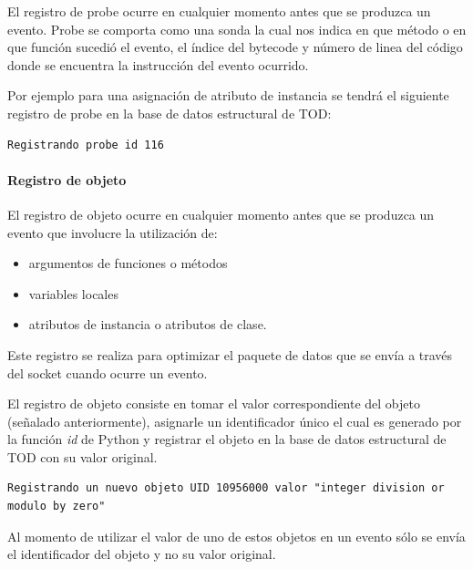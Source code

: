\documentclass[12pt,legalpaper]{report}
\begin{document}
El registro de probe ocurre en cualquier momento antes que se produzca un evento.  Probe se comporta como una sonda la cual nos indica en que método o en que función sucedió el evento, el índice del bytecode y número de linea del código donde se encuentra la instrucción del evento ocurrido.

Por ejemplo para una asignación de atributo de instancia se tendrá el siguiente registro de probe en la base de datos estructural de TOD:

\begin{singlespace}
\begin{lstlisting}[style=consola,numbers=none]
Registrando probe id 116
\end{lstlisting}
\end{singlespace}

				\paragraph{Registro de objeto}
				
El registro de objeto ocurre en cualquier momento antes que se produzca un evento que involucre la utilización de:
\begin{itemize}
	\item argumentos de funciones o métodos
	\item variables locales
	\item atributos de instancia o atributos de clase.  
\end{itemize}

Este registro se realiza para optimizar el paquete de datos que se envía a través del socket cuando ocurre un evento.

El registro de objeto consiste en tomar el valor correspondiente del objeto (señalado anteriormente), asignarle un identificador único el cual es generado por la función \textit{id} de Python y registrar el objeto en la base de datos estructural de TOD con su valor original.

\begin{singlespace}
\begin{lstlisting}[style=consola,numbers=none]
Registrando un nuevo objeto UID 10956000 valor "integer division or modulo by zero"
\end{lstlisting}
\end{singlespace}

Al momento de utilizar el valor de uno de estos objetos en un evento sólo se envía el identificador del objeto y no su valor original.
\end{document}
